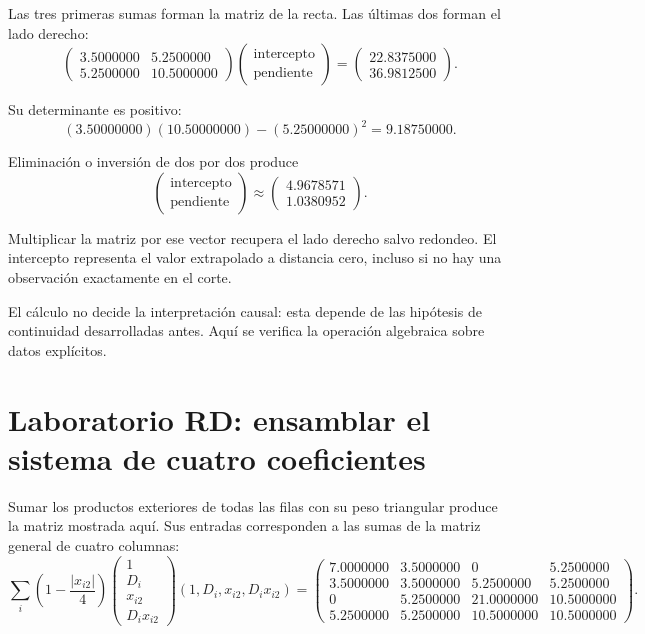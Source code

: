 \documentclass[11pt,a4paper]{article}
\begin{document}
Las tres primeras sumas forman la matriz de la recta.
Las últimas dos forman el lado derecho:
\[
\begin{pmatrix}3.5000000&5.2500000\\5.2500000&10.5000000\end{pmatrix}\begin{pmatrix}\text{intercepto}\\\text{pendiente}\end{pmatrix}=\begin{pmatrix}22.8375000\\36.9812500\end{pmatrix}.
\]

Su determinante es positivo:
\[
(3.50000000)(10.50000000)-(5.25000000)^2=9.18750000.
\]

Eliminación o inversión de dos por dos produce
\[
\begin{pmatrix}\text{intercepto}\\\text{pendiente}\end{pmatrix}\approx\begin{pmatrix}4.9678571\\1.0380952\end{pmatrix}.
\]

Multiplicar la matriz por ese vector recupera
el lado derecho salvo redondeo.
El intercepto representa el valor extrapolado
a distancia cero, incluso si no hay una
observación exactamente en el corte.

El cálculo no decide la interpretación causal:
esta depende de las hipótesis de continuidad
desarrolladas antes. Aquí se verifica
la operación algebraica sobre datos explícitos.

\clearpage
\section{Laboratorio RD: ensamblar el sistema de cuatro coeficientes}\label{unidad53}
Sumar los productos exteriores de todas las filas
con su peso triangular produce la matriz
mostrada aquí. Sus entradas corresponden
a las sumas de la matriz general de cuatro columnas:
\[
\sum_i\left(1-\frac{|x_{i2}|}{4}\right)
\begin{pmatrix}1\\D_i\\x_{i2}\\D_ix_{i2}\end{pmatrix}
(1,D_i,x_{i2},D_ix_{i2})
=\begin{pmatrix}7.0000000&3.5000000&0&5.2500000\\3.5000000&3.5000000&5.2500000&5.2500000\\0&5.2500000&21.0000000&10.5000000\\5.2500000&5.2500000&10.5000000&10.5000000\end{pmatrix}.
\]
\end{document}
